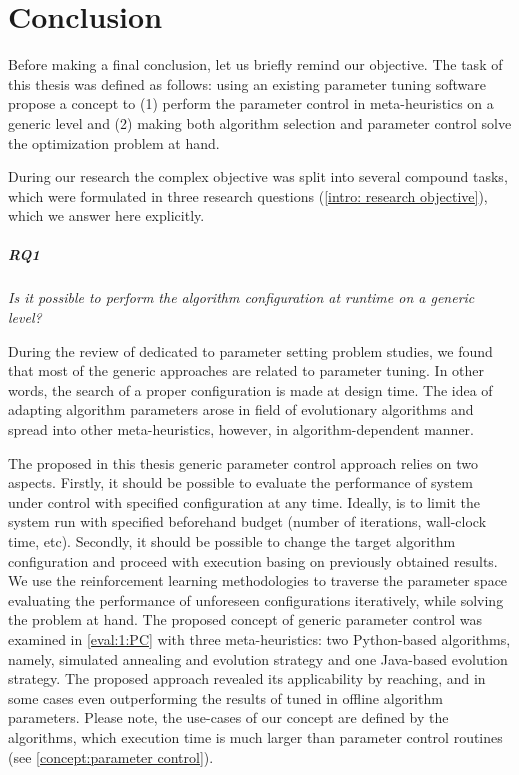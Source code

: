 \chapter{Conclusion}\label{conclusion}
Before making a final conclusion, let us briefly remind our objective.
The task of this thesis was defined as follows: using an existing parameter tuning software propose a concept to (1) perform the parameter control in meta-heuristics on a generic level and (2) making both algorithm selection and parameter control solve the optimization problem at hand.

During our research the complex objective was split into several compound tasks, which were formulated in three research questions (\cref{intro: research objective}), which we answer here explicitly.

\paragraph{RQ1} \emph{Is it possible to perform the algorithm configuration at runtime on a generic level?}
	
During the review of dedicated to parameter setting problem studies, we found that most of the generic approaches are related to parameter tuning. In other words, the search of a proper configuration is made at design time. The idea of adapting algorithm parameters arose in field of evolutionary algorithms and spread into other meta-heuristics, however, in algorithm-dependent manner. 

The proposed in this thesis generic parameter control approach relies on two aspects. Firstly, it should be possible to evaluate the performance of system under control with specified configuration at any time. Ideally, is to limit the system run with specified beforehand budget (number of iterations, wall-clock time, etc). Secondly, it should be possible to change the target algorithm configuration and proceed with execution basing on previously obtained results. We use the reinforcement learning methodologies to traverse the parameter space evaluating the performance of unforeseen configurations iteratively, while solving the problem at hand. The proposed concept of generic parameter control was examined in \cref{eval:1:PC} with three meta-heuristics: two Python-based algorithms, namely, simulated annealing and evolution strategy and one Java-based evolution strategy. The proposed approach revealed its applicability by reaching, and in some cases even outperforming the results of tuned in offline algorithm parameters. Please note, the use-cases of our concept are defined by the algorithms, which execution time is much larger than parameter control routines (see \cref{concept:parameter control}).


